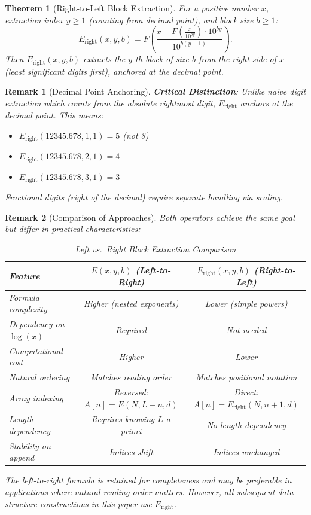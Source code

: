 \documentclass[12pt, a4paper]{article}
\theoremstyle{note}
\newtheorem{theorem}{Theorem}[section]
\newtheorem{remark}{Remark}[section]
\begin{document}
\begin{theorem}[Right-to-Left Block Extraction]\label{thm:block}
For a positive number $x$, extraction index $y \geq 1$ (counting from decimal point), and block size $b \geq 1$:
\[
E_{\text{right}}(x, y, b) = F\!\left(\frac{x - F\!\left(\frac{x}{10^{by}}\right) \cdot 10^{by}}{10^{b(y-1)}}\right).
\]
Then $E_{\text{right}}(x, y, b)$ extracts the $y$-th block of size $b$ from the right side of $x$ (least significant digits first), anchored at the decimal point.
\end{theorem}

\begin{remark}[Decimal Point Anchoring]\label{rem:decimal_anchor}
\textbf{Critical Distinction}: Unlike naive digit extraction which counts from the absolute rightmost digit, $E_{\text{right}}$ anchors at the decimal point. This means:
\begin{itemize}
    \item $E_{\text{right}}(12345.678, 1, 1) = 5$ (not 8)
    \item $E_{\text{right}}(12345.678, 2, 1) = 4$
    \item $E_{\text{right}}(12345.678, 3, 1) = 3$
\end{itemize}
Fractional digits (right of the decimal) require separate handling via scaling.
\end{remark}

\begin{remark}[Comparison of Approaches]\label{rem:comparison}
Both operators achieve the same goal but differ in practical characteristics:

\begin{table}[ht!]
\centering
\caption{Left vs.\ Right Block Extraction Comparison}
\begin{tabular}{l|c|c}
Feature & $E(x,y,b)$ (Left-to-Right) & $E_{\text{right}}(x,y,b)$ (Right-to-Left) \\ \hline
Formula complexity & Higher (nested exponents) & Lower (simple powers) \\
Dependency on $\log(x)$ & Required & Not needed \\
Computational cost & Higher & Lower \\
Natural ordering & Matches reading order & Matches positional notation \\
Array indexing & Reversed: $A[n] = E(N, L{-}n, d)$ & Direct: $A[n] = E_{\text{right}}(N, n{+}1, d)$ \\
Length dependency & Requires knowing $L$ a priori & No length dependency \\
Stability on append & Indices shift & Indices unchanged \\
\end{tabular}
\end{table}

The left-to-right formula is retained for completeness and may be preferable in applications where natural reading order matters. However, all subsequent data structure constructions in this paper use $E_{\text{right}}$.
\end{remark}
\end{document}
